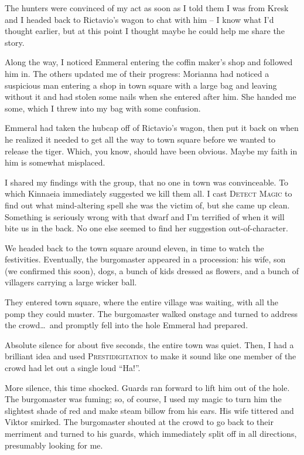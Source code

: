 The hunters were convinced of my act as soon as I told them I was from Kresk and I headed back to Rictavio's wagon to chat with him -- I know what I'd thought earlier, but at this point I thought maybe he could help me share the story.

Along the way, I noticed Emmeral entering the coffin maker's shop and followed him in. The others updated me of their progress: Morianna had noticed a suspicious man entering a shop in town square with a large bag and leaving without it and had stolen some nails when she entered after him. She handed me some, which I threw into my bag with some confusion.

Emmeral had taken the hubcap off of Rictavio's wagon, then put it back on when he realized it needed to get all the way to town square before we wanted to release the tiger. Which, you know, should have been obvious. Maybe my faith in him is somewhat misplaced.

I shared my findings with the group, that no one in town was convinceable. To which Kinnaeia immediately suggested we kill them all. I cast \textsc{Detect Magic} to find out what mind-altering spell she was the victim of, but she came up clean. Something is seriously wrong with that dwarf and I'm terrified of when it will bite us in the back. No one else seemed to find her suggestion out-of-character.

We headed back to the town square around eleven, in time to watch the festivities. Eventually, the burgomaster appeared in a procession: his wife, son (we confirmed this soon), dogs, a bunch of kids dressed as flowers, and a bunch of villagers carrying a large wicker ball.

They entered town square, where the entire village was waiting, with all the pomp they could muster. The burgomaster walked onstage and turned to address the crowd\dots\ and promptly fell into the hole Emmeral had prepared.

Absolute silence for about five seconds, the entire town was quiet. Then, I had a brilliant idea and used \textsc{Prestidigitation} to make it sound like one member of the crowd had let out a single loud ``Ha!''.

More silence, this time shocked. Guards ran forward to lift him out of the hole. The burgomaster was fuming; so, of course, I used my magic to turn him the slightest shade of red and make steam billow from his ears. His wife tittered and Viktor smirked. The burgomaster shouted at the crowd to go back to their merriment and turned to his guards, which immediately split off in all directions, presumably looking for me.

